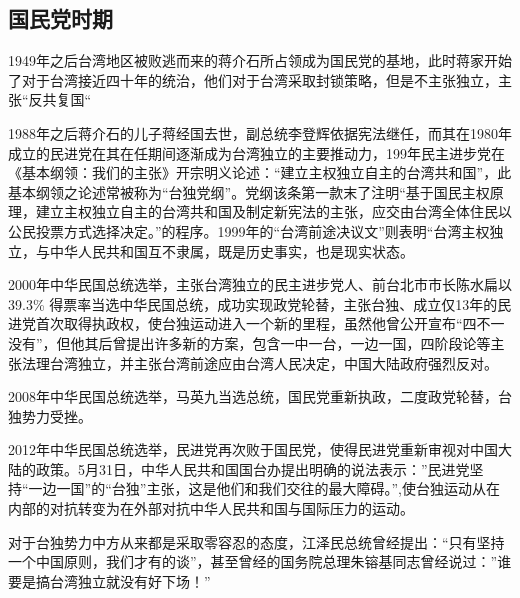 \documentclass[11pt,a4paper]{ctexart}
\begin{document}
     \subsection{国民党时期}
     1949年之后台湾地区被败逃而来的蒋介石所占领成为国民党的基地，此时蒋家开始了对于台湾接近四十年的统治，他们对于台湾采取封锁策略，但是不主张独立，主张“反共复国“\par
     1988年之后蒋介石的儿子蒋经国去世，副总统李登辉依据宪法继任，而其在1980年成立的民进党在其在任期间逐渐成为台湾独立的主要推动力，199年民主进步党在《基本纲领：我们的主张》开宗明义论述：“建立主权独立自主的台湾共和国”，此基本纲领之论述常被称为“台独党纲”。党纲该条第一款末了注明“基于国民主权原理，建立主权独立自主的台湾共和国及制定新宪法的主张，应交由台湾全体住民以公民投票方式选择决定。”的程序。1999年的“台湾前途决议文”则表明“台湾主权独立，与中华人民共和国互不隶属，既是历史事实，也是现实状态。\par
     2000年中华民国总统选举，主张台湾独立的民主进步党人、前台北市市长陈水扁以39.3\% 得票率当选中华民国总统，成功实现政党轮替，主张台独、成立仅13年的民进党首次取得执政权，使台独运动进入一个新的里程，虽然他曾公开宣布“四不一没有”，但他其后曾提出许多新的方案，包含一中一台，一边一国，四阶段论等主张法理台湾独立，并主张台湾前途应由台湾人民决定，中国大陆政府强烈反对。\par
     2008年中华民国总统选举，马英九当选总统，国民党重新执政，二度政党轮替，台独势力受挫。\par
     2012年中华民国总统选举，民进党再次败于国民党，使得民进党重新审视对中国大陆的政策。5月31日，中华人民共和国国台办提出明确的说法表示：”民进党坚持“一边一国”的“台独”主张，这是他们和我们交往的最大障碍。”,使台独运动从在内部的对抗转变为在外部对抗中华人民共和国与国际压力的运动。\par
     对于台独势力中方从来都是采取零容忍的态度，江泽民总统曾经提出：“只有坚持一个中国原则，我们才有的谈”，甚至曾经的国务院总理朱镕基同志曾经说过：”谁要是搞台湾独立就没有好下场！”\cite{q2}
     
\end{document}
